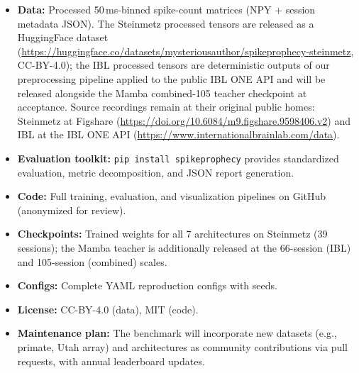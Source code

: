 \documentclass{article}
\begin{document}
\begin{itemize}[nosep, leftmargin=*]
  \item \textbf{Data:} Processed 50\,ms-binned spike-count matrices
    (NPY + session metadata JSON).  The Steinmetz processed tensors
    are released as a HuggingFace dataset
    (\url{https://huggingface.co/datasets/mysteriousauthor/spikeprophecy-steinmetz},
    CC-BY-4.0); the IBL processed tensors are deterministic outputs
    of our preprocessing pipeline applied to the public IBL ONE
    API and will be released alongside the Mamba combined-105
    teacher checkpoint at acceptance.  Source recordings remain at
    their original public homes: Steinmetz at Figshare
    (\url{https://doi.org/10.6084/m9.figshare.9598406.v2}) and IBL
    at the IBL ONE API
    (\url{https://www.internationalbrainlab.com/data}).
  \item \textbf{Evaluation toolkit:} \texttt{pip install spikeprophecy}
    provides standardized evaluation, metric decomposition, and
    JSON report generation.
  \item \textbf{Code:} Full training, evaluation, and visualization
    pipelines on GitHub (anonymized for review).
  \item \textbf{Checkpoints:} Trained weights for all 7 architectures
    on Steinmetz (39 sessions); the Mamba teacher is additionally
    released at the 66-session (IBL) and 105-session (combined) scales.
  \item \textbf{Configs:} Complete YAML reproduction configs with seeds.
  \item \textbf{License:} CC-BY-4.0 (data), MIT (code).
  \item \textbf{Maintenance plan:} The benchmark will incorporate new
    datasets (e.g., primate, Utah array) and architectures as community
    contributions via pull requests, with annual leaderboard updates.
\end{itemize}


\end{document}
